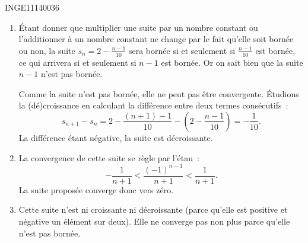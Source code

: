 

\begin{corrige}{INGE11140036}

	\begin{enumerate}

		\item

			Étant donner que multiplier une suite par un nombre constant ou l'additionner à un nombre constant ne change par le fait qu'elle soit bornée ou non, la suite $s_n=2-\frac{ n-1 }{ 10 }$ sera bornée si et seulement si $\frac{ n-1 }{ 10 }$ est bornée, ce qui arrivera si et seulement si $n-1$ est bornée. Or on sait bien que la suite $n-1$ n'est pas bornée.

			Comme la suite n'est pas bornée, elle ne peut pas être convergente. Étudions la (dé)croissance en calculant la différence entre deux termes consécutifs~:
			\begin{equation}
				s_{n+1}-s_n=2-\frac{ (n+1)-1 }{ 10 }-\left( 2-\frac{ n-1 }{ 10 } \right)=-\frac{ 1 }{ 10 }.
			\end{equation}
			La différence étant négative, la suite est décroissante.

		\item
			La convergence de cette suite se règle par l'étau~:
			\begin{equation}
				-\frac{ 1 }{ n+1 }<\frac{ (-1)^{n-1} }{ n+1 }<\frac{ 1 }{ n+1 }.
			\end{equation}
			La suite proposée converge donc vers zéro.

		\item
			Cette suite n'est ni croissante ni décroissante (parce qu'elle est positive et négative un élément sur deux). Elle ne converge pas non plus parce qu'elle n'est pas bornée.

	\end{enumerate}

\end{corrige}
